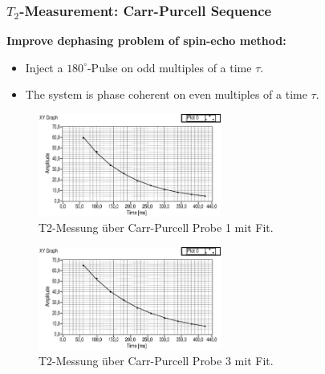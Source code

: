 \documentclass[aspectratio=169]{beamer}
\begin{document}
\begin{frame}
	\frametitle{$T_2$-Measurement: Carr-Purcell Sequence}
	\textbf{Improve dephasing problem of spin-echo method:}
	\begin{itemize}
		\item Inject a $180^\circ$-Pulse on odd multiples of a time $\tau$.
		\item The system is phase coherent on even multiples of a time $\tau$.
	\end{itemize}
	\begin{minipage}[t]{0.45\textwidth}
		\centering
		\begin{figure}
			\includegraphics[width=60mm]{./Resources/t2_p1_cp.eps}
			\caption{T2-Messung über Carr-Purcell Probe 1 mit Fit.}
			\label{fig:t2_p1_cp}
		\end{figure}
	\end{minipage}
	\hfill
	\begin{minipage}[t]{0.45\textwidth}
		\centering
		\begin{figure}
			\includegraphics[width=60mm]{./Resources/t2_p3_cp.eps}
			\caption{T2-Messung über Carr-Purcell Probe 3 mit Fit.}
			\label{fig:t2_p3_cp}
		\end{figure}
	\end{minipage}
\end{frame}
\end{document}
